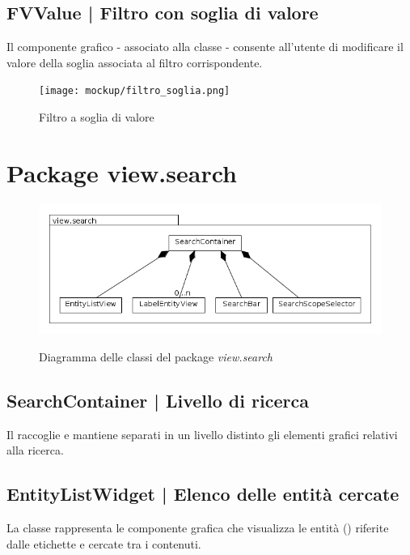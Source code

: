 \documentclass[10pt,a4paper,headinclude,footinclude,hidelinks]{scrreprt} %
\begin{document}
	\subsection[FVValue]{FVValue | Filtro con soglia di valore}
	\label{sec:stage:design:view.filter:value-filter}
	Il componente grafico - associato alla classe \textit{} - consente all'utente di modificare il valore della soglia associata al filtro corrispondente.

	\begin{figure}[ht]
		\begin{center}
	    	\texttt{[image: mockup/filtro\_soglia.png]}
			\label{gfx:mockup:filter:value}
			\caption{Filtro a soglia di valore}
		\end{center}
	\end{figure}

	\section{Package view.search}
	\label{sec:stage:design:view.search}

	\begin{figure}[ht]
		\begin{center}
	    	\includegraphics[width=12cm]{class/view_search.png}
			\label{gfx:class:view:search}
			\caption{Diagramma delle classi del package \textit{view.search}}
		\end{center}
	\end{figure}

	\subsection[SearchContainer]{SearchContainer | Livello di ricerca}
	\label{sec:stage:design:view.search:search-container}
	Il \textit{} raccoglie e mantiene separati in un livello distinto gli elementi grafici relativi alla ricerca.

	\subsection[EntityListWidget]{EntityListWidget | Elenco delle entità cercate}
	\label{sec:stage:design:view.search:search-entity-list}
	La classe \textit{} rappresenta le componente grafica che visualizza le entità (\textit{}) riferite dalle etichette e cercate tra i contenuti.
\end{document}
